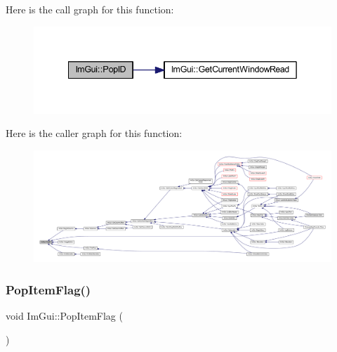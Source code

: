 Here is the call graph for this function\+:
\nopagebreak
\begin{figure}[H]
\begin{center}
\leavevmode
\includegraphics[width=342pt]{namespace_im_gui_aba0b2d8f890a5d435ae43d0c4a2d4dd1_cgraph}
\end{center}
\end{figure}
Here is the caller graph for this function\+:
\nopagebreak
\begin{figure}[H]
\begin{center}
\leavevmode
\includegraphics[width=350pt]{namespace_im_gui_aba0b2d8f890a5d435ae43d0c4a2d4dd1_icgraph}
\end{center}
\end{figure}
\mbox{\label{namespace_im_gui_aa93281155e1dd23715dbd384e91edc6b}} 
\subsubsection{\texorpdfstring{Pop\+Item\+Flag()}{PopItemFlag()}}
{\footnotesize\ttfamily void Im\+Gui\+::\+Pop\+Item\+Flag (\begin{DoxyParamCaption}{ }\end{DoxyParamCaption})}

